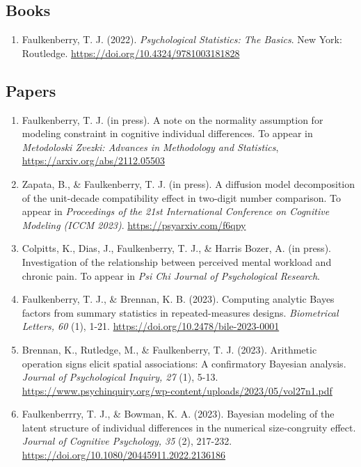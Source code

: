 \documentclass[article,10pt]{article}
\begin{document}
\subsection*{Books}
\label{sec:orgeb78fc0}
\begin{enumerate}
\item Faulkenberry, T. J. (2022). \emph{Psychological Statistics: The Basics}. New York: Routledge. \url{https://doi.org/10.4324/9781003181828}
\end{enumerate}

\subsection*{Papers}
\label{sec:org6975e4c}
\begin{enumerate}
\item Faulkenberry, T. J. (in press). A note on the normality assumption for modeling constraint in cognitive individual differences. To appear in \emph{Metodoloski Zvezki: Advances in Methodology and Statistics}, \url{https://arxiv.org/abs/2112.05503}
\item Zapata, B., \& Faulkenberry, T. J. (in press). A diffusion model decomposition of the unit-decade compatibility effect in two-digit number comparison. To appear in \emph{Proceedings of the 21st International Conference on Cognitive Modeling (ICCM 2023)}. \url{https://psyarxiv.com/f6qpy}
\item Colpitts, K., Dias, J., Faulkenberry, T. J., \& Harris Bozer, A. (in press). Investigation of the relationship between perceived mental workload and chronic pain. To appear in \emph{Psi Chi Journal of Psychological Research}.
\item Faulkenberry, T. J., \& Brennan, K. B. (2023). Computing analytic Bayes factors from summary statistics in repeated-measures designs. \emph{Biometrical Letters, 60} (1), 1-21. \url{https://doi.org/10.2478/bile-2023-0001}
\item Brennan, K., Rutledge, M., \& Faulkenberry, T. J. (2023). Arithmetic operation signs elicit spatial associations: A confirmatory Bayesian analysis. \emph{Journal of Psychological Inquiry, 27} (1), 5-13. \url{https://www.psychinquiry.org/wp-content/uploads/2023/05/vol27n1.pdf}
\item Faulkenberrry, T. J., \& Bowman, K. A. (2023). Bayesian modeling of the latent structure of individual differences in the numerical size-congruity effect. \emph{Journal of Cognitive Psychology, 35} (2), 217-232. \url{https://doi.org/10.1080/20445911.2022.2136186}

\end{enumerate}
\end{document}
